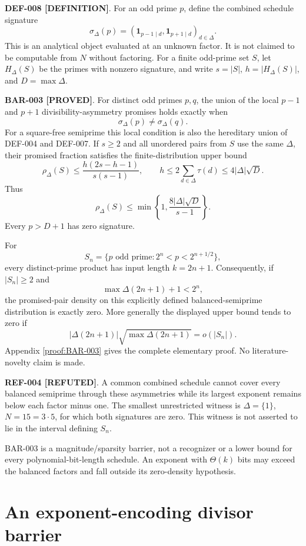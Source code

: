 \documentclass[11pt]{article}
\newcommand{\claimstatus}[2]{\textbf{#1 [#2]}}
\begin{document}
\claimstatus{DEF-008}{DEFINITION}. For an odd prime \(p\), define the combined
schedule signature
\[
\sigma_\Delta(p)=
\left(
\mathbf1_{p-1\mid d},\mathbf1_{p+1\mid d}
\right)_{d\in\Delta}.
\]
This is an analytical object evaluated at an unknown factor. It is not
claimed to be computable from \(N\) without factoring. For a finite odd-prime
set \(S\), let \(H_\Delta(S)\) be the primes with nonzero signature, and write
\(s=|S|\), \(h=|H_\Delta(S)|\), and \(D=\max\Delta\).

\claimstatus{BAR-003}{PROVED}. For distinct odd primes \(p,q\), the union of
the local \(p-1\) and \(p+1\) divisibility-asymmetry promises holds exactly
when
\[
\sigma_\Delta(p)\ne\sigma_\Delta(q).
\]
For a square-free semiprime this local condition is also the hereditary union
of DEF-004 and DEF-007. If \(s\ge2\) and all unordered pairs from \(S\) use
the same \(\Delta\), their promised fraction satisfies the
finite-distribution upper bound
\[
\rho_\Delta(S)
\le
\frac{h(2s-h-1)}{s(s-1)},\qquad
h\le2\sum_{d\in\Delta}\tau(d)
\le4|\Delta|\sqrt D.                              \tag{2}
\]
Thus
\[
\rho_\Delta(S)
\le
\min\left\{1,\frac{8|\Delta|\sqrt D}{s-1}\right\}.
\]
Every \(p>D+1\) has zero signature.

For
\[
S_n=\{p\text{ odd prime}:2^n<p<2^{n+1/2}\},
\]
every distinct-prime product has input length \(k=2n+1\). Consequently, if
\(|S_n|\ge2\) and
\[
\max\Delta(2n+1)+1<2^n,
\]
the promised-pair density on this explicitly defined balanced-semiprime
distribution is exactly zero. More generally the displayed upper bound tends
to zero if
\[
|\Delta(2n+1)|\sqrt{\max\Delta(2n+1)}=o(|S_n|).
\]
Appendix \ref{proof:BAR-003} gives the complete elementary proof. No
literature-novelty claim is made.

\claimstatus{REF-004}{REFUTED}. A common combined schedule cannot cover every
balanced semiprime through these asymmetries while its largest exponent
remains below each factor minus one. The smallest unrestricted witness is
\(\Delta=\{1\}\), \(N=15=3\cdot5\), for which both signatures are zero. This
witness is not asserted to lie in the interval defining \(S_n\).

BAR-003 is a magnitude/sparsity barrier, not a recognizer or a lower bound for
every polynomial-bit-length schedule. An exponent with \(\Theta(k)\) bits may
exceed the balanced factors and fall outside its zero-density hypothesis.

\section{An exponent-encoding divisor barrier}
\end{document}

